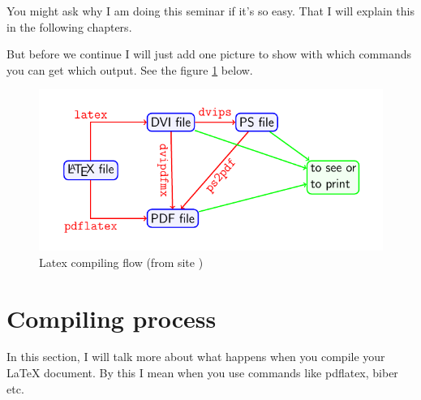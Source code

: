 \documentclass[a4paper,oneside,8pt]{extarticle}
\newcommand{\latex}{\LaTeX\xspace}
\begin{document}
You might ask why I am doing this seminar if it's so easy. That I will explain this in the following chapters.

But before we continue I will just add one picture to show with which commands you can get which output. See the figure \ref{fig:latex-compiling-flow} below.
\begin{figure}[h]
    \includegraphics[width=\textwidth]{Latex-file-flow.png}
    \caption{Latex compiling flow (from site \cite{Overleaf_Compilers}) }
    \label{fig:latex-compiling-flow}
\end{figure}

\section{Compiling process}

In this section, I will talk more about what happens when you compile your \latex document. By this I mean when you use commands like pdflatex, biber etc. 
\end{document}
